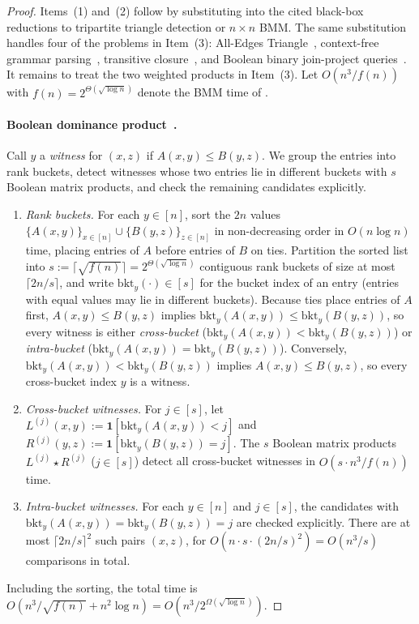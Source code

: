 \documentclass[11pt]{article}
\theoremstyle{definition}
\newcommand{\One}{\mathbf{1}}
\begin{document}
\begin{proof}
Items~(1) and~(2) follow by substituting  into the cited black-box reductions to tripartite triangle detection or $n \times n$ BMM. The same substitution handles four of the problems in Item~(3): All-Edges Triangle~\cite{WilliamsW18}, context-free grammar parsing~\cite{Valiant75,Lee02}, transitive closure~\cite{FischerM71,Munro71}, and Boolean binary join-project queries~\cite{AmossenP09,GuchtWWZ15}. It remains to treat the two weighted products in Item~(3). Let $O(n^3 / f(n))$ with $f(n) = 2^{\Theta(\sqrt{\log n})}$ denote the BMM time of .

\paragraph{Boolean dominance product~\cite{Matousek91}.}
Call $y$ a \emph{witness} for $(x, z)$ if $A(x, y) \le B(y, z)$. We group the entries into rank buckets, detect witnesses whose two entries lie in different buckets with $s$ Boolean matrix products, and check the remaining candidates explicitly.
\begin{enumerate}[label=(\roman*), leftmargin=*]
    \item \emph{Rank buckets.} For each $y \in [n]$, sort the $2n$ values $\{A(x, y)\}_{x \in [n]} \cup \{B(y, z)\}_{z \in [n]}$ in non-decreasing order in $O(n\log n)$ time, placing entries of $A$ before entries of $B$ on ties. Partition the sorted list into $s := \lceil \sqrt{f(n)} \rceil = 2^{\Theta(\sqrt{\log n})}$ contiguous rank buckets of size at most $\lceil 2n / s \rceil$, and write $\mathrm{bkt}_y(\cdot) \in [s]$ for the bucket index of an entry (entries with equal values may lie in different buckets). Because ties place entries of $A$ first, $A(x, y) \le B(y, z)$ implies $\mathrm{bkt}_y(A(x, y)) \le \mathrm{bkt}_y(B(y, z))$, so every witness is either \emph{cross-bucket} ($\mathrm{bkt}_y(A(x, y)) < \mathrm{bkt}_y(B(y, z))$) or \emph{intra-bucket} ($\mathrm{bkt}_y(A(x, y)) = \mathrm{bkt}_y(B(y, z))$). Conversely, $\mathrm{bkt}_y(A(x, y)) < \mathrm{bkt}_y(B(y, z))$ implies $A(x, y) \le B(y, z)$, so every cross-bucket index $y$ is a witness.
    \item \emph{Cross-bucket witnesses.} For $j \in [s]$, let $L^{(j)}(x, y) := \One[\mathrm{bkt}_y(A(x, y)) < j]$ and $R^{(j)}(y, z) := \One[\mathrm{bkt}_y(B(y, z)) = j]$. The $s$ Boolean matrix products $L^{(j)} \star R^{(j)}$ ($j \in [s]$) detect all cross-bucket witnesses in $O(s \cdot n^3 / f(n))$ time.
    \item \emph{Intra-bucket witnesses.} For each $y \in [n]$ and $j \in [s]$, the candidates with $\mathrm{bkt}_y(A(x, y)) = \mathrm{bkt}_y(B(y, z)) = j$ are checked explicitly. There are at most $\lceil 2n / s \rceil^2$ such pairs $(x, z)$, for $O(n \cdot s \cdot (2n / s)^2) = O(n^3 / s)$ comparisons in total.
\end{enumerate}
Including the sorting, the total time is $O(n^3 / \sqrt{f(n)} + n^2\log n) = O(n^3 / 2^{\Omega(\sqrt{\log n})})$.


\end{proof}
\end{document}
